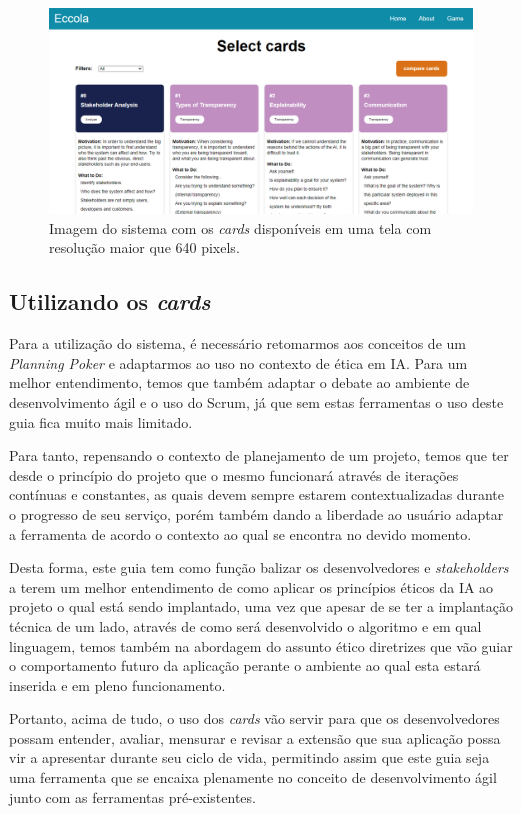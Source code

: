 \begin{figure}[h!]
    \centering
    \includegraphics[width=\textwidth]{img/eccola_cards.png}
    \caption{Imagem do sistema com os \textit{cards} disponíveis em uma tela com resolução maior que 640 pixels.}
    \label{fig:eccola_cards}
\end{figure}

\subsection{Utilizando os \textit{cards}}
\label{utilizandocards}
Para a utilização do sistema, é necessário retomarmos aos conceitos de um \textit{Planning Poker} e adaptarmos ao uso no contexto de ética em IA. Para um melhor entendimento, temos que também adaptar o debate ao ambiente de desenvolvimento ágil e o uso do Scrum, já que sem estas ferramentas o uso deste guia fica muito mais limitado.

Para tanto, repensando o contexto de planejamento de um projeto, temos que ter desde o princípio do projeto que o mesmo funcionará através de iterações contínuas e constantes, as quais devem sempre estarem contextualizadas durante o progresso de seu serviço, porém também dando a liberdade ao usuário adaptar a ferramenta de acordo o contexto ao qual se encontra no devido momento.

Desta forma, este guia tem como função balizar os desenvolvedores e \textit{stakeholders} a terem um melhor entendimento de como aplicar os princípios éticos da \acrshort{IA} ao projeto o qual está sendo implantado, uma vez que apesar de se ter a implantação técnica de um lado, através de como será desenvolvido o algoritmo e em qual linguagem, temos também na abordagem do assunto ético diretrizes que vão guiar o comportamento futuro da aplicação perante o ambiente ao qual esta estará inserida e em pleno funcionamento. 

Portanto, acima de tudo, o uso dos \textit{cards} vão servir para que os desenvolvedores possam entender, avaliar, mensurar e revisar a extensão que sua aplicação possa vir a apresentar durante seu ciclo de vida, permitindo assim que este guia seja uma ferramenta que se encaixa plenamente no conceito de desenvolvimento ágil junto com as ferramentas pré-existentes.

